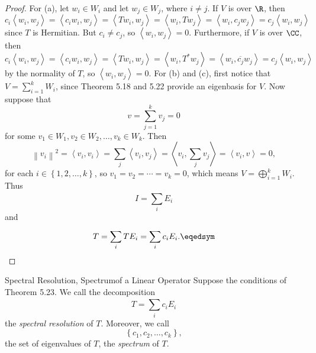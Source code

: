 \documentclass[linearalgebraII]{subfiles}
\begin{document}
    \begin{proof}
        For (a), let $w_i\in W_i$ and let $w_j\in W_j$, where $i\neq j$. If $V$ is over $\R$, then
        \begin{equation*}
            c_i\left\langle w_i, w_j\right\rangle = \left\langle c_iw_i, w_j\right\rangle = \left\langle Tw_i, w_j\right\rangle = \left\langle w_i, Tw_j\right\rangle = \left\langle w_i, c_jw_j\right\rangle = c_j\left\langle w_i, w_j\right\rangle 
        \end{equation*}
        since $T$ is Hermitian. But $c_i\neq c_j$, so $\left\langle w_i, w_j\right\rangle = 0$. Furthermore, if $V$ is over $\CC$, then
        \begin{equation*}
            c_i\left\langle w_i, w_j\right\rangle = \left\langle c_iw_i, w_j\right\rangle = \left\langle Tw_i, w_j\right\rangle = \left\langle w_i, T^*w_j\right\rangle = \left\langle w_i, \overline{c_j} w_j\right\rangle = c_j\left\langle w_i, w_j\right\rangle 
        \end{equation*}
        by the normality of $T$, so $\left\langle w_i, w_j\right\rangle = 0$. For (b) and (c), first notice that $V = \sum^{k}_{i=1} W_i$, since Theorem 5.18 and 5.22 provide an eigenbasis for $V$. Now suppose that
        \begin{equation*}
            v = \sum^{k}_{j=1} v_j = 0
        \end{equation*}
        for some $v_1\in W_1, v_2\in W_2, \ldots, v_k\in W_k$. Then
        \begin{equation*}
            \left\lVert v_i\right\rVert ^2 = \left\langle v_i, v_i\right\rangle = \sum^{}_{j} \left\langle v_i, v_j\right\rangle = \left\langle v_i, \sum^{}_{j} v_j\right\rangle = \left\langle v_i, v\right\rangle = 0,
        \end{equation*}
        for each $i\in \left\lbrace 1,2,\ldots,k \right\rbrace$, so $v_1=v_2=\cdots=v_k=0$, which means $V = \bigoplus^{k}_{i=1} W_i$. Thus
        \begin{equation*}
            I = \sum^{}_{i} E_i
        \end{equation*}
        and
        \begin{equation*}
            T = \sum^{}_{i} TE_i = \sum^{}_{i} c_iE_i. \eqedsym
        \end{equation*}
    \end{proof}

    \begin{definition}{Spectral Resolution, Spectrum}{of a Linear Operator}
        Suppose the conditions of Theorem 5.23. We call the decomposition
        \begin{equation*}
            T = \sum^{}_{i} c_iE_i
        \end{equation*}
        the \emph{spectral resolution} of $T$. Moreover, we call
        \begin{equation*}
            \left\lbrace c_1,c_2,\ldots,c_k \right\rbrace ,
        \end{equation*}
        the set of eigenvalues of $T$, the \emph{spectrum} of $T$.
    \end{definition}
\end{document}
